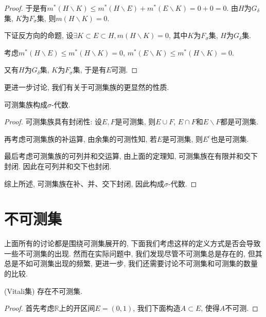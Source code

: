 \documentclass[theorem=false,mathfont=none,openany,sub3section]{easybook}
\begin{document}
\begin{proof}
  于是有$m^{*}(H\backslash K)\leqslant m^{*}(H\backslash E)+m^{*}(E\backslash K)=0+0=0$. 由$H$为$G_{\delta}$集, $K$为$F_{\sigma}$集, 则$m(H\backslash K)=0$.\par
  下证反方向的命题, 设$\exists K\subset E\subset H, m(H\backslash K)=0$, 其中$K$为$F_{\sigma}$集, $H$为$G_{\delta}$集.\par
  考虑$m^{*}(H\backslash E)\leqslant m^{*}(H\backslash K)=0$, $m^{*}(E\backslash K)\leqslant m^{*}(H\backslash K)=0$.\par
  又有$H$为$G_{\delta}$集, $K$为$F_{\sigma}$集, 于是有$E$可测.\par
\end{proof}

更进一步讨论, 我们有关于可测集族的更显然的性质.\par

\begin{theorem}
  可测集族构成$\sigma$-代数.\par
\end{theorem}

\begin{proof}
  可测集族具有封闭性: 设$E,F$是可测集, 则$E\cup F$, $E\cap F$和$E\backslash F$都是可测集.\par
  再考虑可测集族的补运算, 由余集的可测性知, 若$E$是可测集, 则$E^c$也是可测集.\par
  最后考虑可测集族的可列并和交运算, 由上面的定理知, 可测集族在有限并和交下封闭. 因此在可列并和交下也封闭.\par
  综上所述, 可测集族在补、并、交下封闭, 因此构成$\sigma$-代数.\par
\end{proof}

\newpage

\section{不可测集}

上面所有的讨论都是围绕可测集展开的, 下面我们考虑这样的定义方式是否会导致一些不可测集的出现. 然而在实际问题中, 我们发现尽管不可测集总是存在的, 但其总是不如可测集出现的频繁, 更进一步, 我们还需要讨论不可测集和可测集的数量的比较.\par

\begin{theorem}
  (Vitali集) 存在不可测集.\par
\end{theorem}

\begin{proof}
  首先考虑$\mathbb{R}$上的开区间$E=(0,1)$, 我们下面构造$A\subset E$, 使得$A$不可测.\par

\end{proof}
\end{document}
